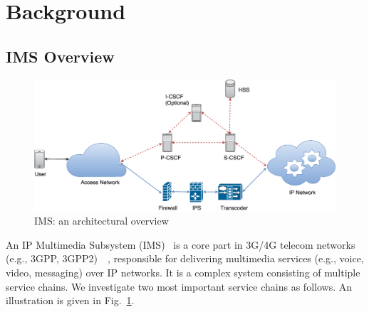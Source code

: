 \section{Background} \label{sec:scalims-background}
\subsection{IMS Overview}

\begin{figure}[!h]
        \centering
        \includegraphics[width=1\columnwidth]{chap-scalims/figure/IMS_architecture.eps}
        \caption{IMS: an architectural overview}
        \label{fig:IMS_architecture}
\end{figure}

An IP Multimedia Subsystem (IMS)~\cite{3gpp-ims} is a core part in 3G/4G telecom networks (e.g., 3GPP, 3GPP2)~\cite{umts}~\cite{lte}, responsible for delivering multimedia services (e.g., voice, video, messaging) over IP networks. It is a complex system consisting of multiple service chains. We investigate two most important service chains as follows. An illustration is given in Fig.~\ref{fig:IMS_architecture}.

